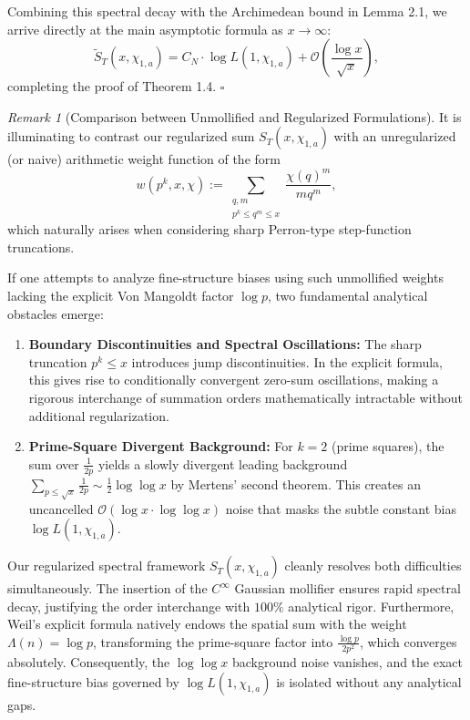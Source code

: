 \documentclass[12pt,reqno]{amsart}
\theoremstyle{definition}
\theoremstyle{remark}
\newtheorem{remark}[theorem]{Remark}
\numberwithin{equation}{section}
\begin{document}
Combining this spectral decay with the Archimedean bound in Lemma 2.1, we arrive directly at the main asymptotic formula as $x \to \infty$:
\[
\widetilde{S}_T(x, \chi_{1,a}) = C_N \cdot \log L(1, \chi_{1,a}) + \mathcal{O}\left( \frac{\log x}{\sqrt{x}} \right), \tag{2.11}
\]
completing the proof of Theorem 1.4. $\square$

\begin{remark}[Comparison between Unmollified and Regularized Formulations]\label{rem:weight_comparison}
It is illuminating to contrast our regularized sum $S_T(x, \chi_{1,a})$ with an unregularized (or naive) arithmetic weight function of the form
\begin{equation}
w(p^k, x, \chi) := \sum_{\substack{q, m \\ p^k \le q^m \le x}} \frac{\chi(q)^m}{m q^m},
\end{equation}
which naturally arises when considering sharp Perron-type step-function truncations.

If one attempts to analyze fine-structure biases using such unmollified weights lacking the explicit Von Mangoldt factor $\log p$, two fundamental analytical obstacles emerge:
\begin{enumerate}
    \item \textbf{Boundary Discontinuities and Spectral Oscillations:} The sharp truncation $p^k \le x$ introduces jump discontinuities. In the explicit formula, this gives rise to conditionally convergent zero-sum oscillations, making a rigorous interchange of summation orders mathematically intractable without additional regularization.
    \item \textbf{Prime-Square Divergent Background:} For $k=2$ (prime squares), the sum over $\frac{1}{2p}$ yields a slowly divergent leading background $\sum_{p \le \sqrt{x}} \frac{1}{2p} \sim \frac{1}{2}\log\log x$ by Mertens' second theorem. This creates an uncancelled $\mathcal{O}(\log x \cdot \log\log x)$ noise that masks the subtle constant bias $\log L(1, \chi_{1,a})$.
\end{enumerate}

Our regularized spectral framework $S_T(x, \chi_{1,a})$ cleanly resolves both difficulties simultaneously. The insertion of the $C^\infty$ Gaussian mollifier ensures rapid spectral decay, justifying the order interchange with $100\%$ analytical rigor. Furthermore, Weil's explicit formula natively endows the spatial sum with the weight $\Lambda(n) = \log p$, transforming the prime-square factor into $\frac{\log p}{2p^2}$, which converges absolutely. Consequently, the $\log\log x$ background noise vanishes, and the exact fine-structure bias governed by $\log L(1, \chi_{1,a})$ is isolated without any analytical gaps.
\end{remark}
\end{document}

